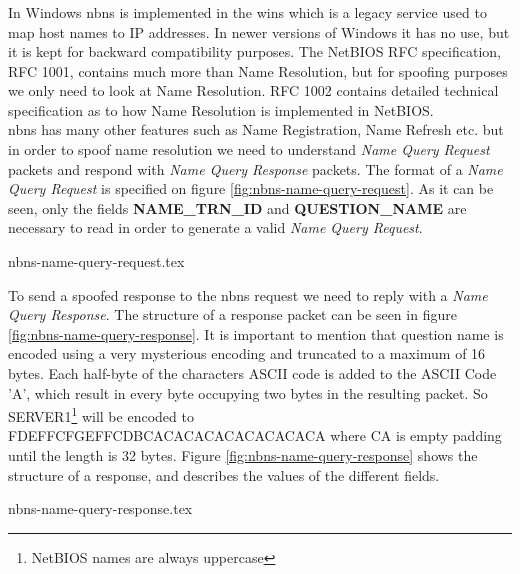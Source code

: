 \documentclass{article}
\begin{document}

\subsubsection{}
\label{sec:nbns}
In Windows \gls{nbns} is implemented in the \gls{wins} which is a legacy service used to map host names to IP addresses. In newer versions of Windows it has no use, but it is kept for backward compatibility purposes. The NetBIOS RFC specification, RFC 1001\cite{url:rfc:netbios}, contains much more than Name Resolution, but for spoofing purposes we only need to look at Name Resolution.
RFC 1002\cite{url:rfc:netbios-technical} contains detailed technical specification as to how Name Resolution is implemented in NetBIOS.\\
\gls{nbns} has many other features such as Name Registration, Name Refresh etc. but in order to spoof name resolution we need to understand \emph{Name Query Request} packets and respond with \emph{Name Query Response} packets. The format of a \emph{Name Query Request} is specified on figure \ref{fig:nbns-name-query-request}. As it can be seen, only the fields \textbf{NAME\_TRN\_ID} and \textbf{QUESTION\_NAME} are necessary to read in order to generate a valid \emph{Name Query Request}.

{nbns-name-query-request.tex}

To send a spoofed response to the \gls{nbns} request we need to reply with a \emph{Name Query Response}. The structure of a response packet can be seen in figure \ref{fig:nbns-name-query-response}. It is important to mention that question name is encoded using a very mysterious encoding and truncated to a maximum of 16 bytes. Each half-byte of the characters ASCII code is added to the ASCII Code 'A'\cite{url:nbns-name-encoding}, which result in every byte occupying two bytes in the resulting packet. So SERVER1\footnote{NetBIOS names are always uppercase} will be encoded to FDEFFCFGEFFCDBCACACACACACACACACA where CA is empty padding until the length is 32 bytes. Figure \ref{fig:nbns-name-query-response} shows the structure of a response, and describes the values of the different fields.

{nbns-name-query-response.tex}
\end{document}
